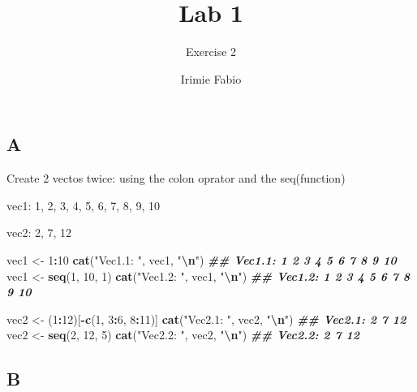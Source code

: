 \documentclass[
]{article}
\title{Lab 1}
\subtitle{Exercise 2}
\author{Irimie Fabio}
\date{}
\newenvironment{Shaded}{\begin{snugshade}}{\end{snugshade}}
\newcommand{\DecValTok}[1]{\textcolor[rgb]{0.00,0.00,0.81}{#1}}
\newcommand{\DocumentationTok}[1]{\textcolor[rgb]{0.56,0.35,0.01}{\textbf{\textit{#1}}}}
\newcommand{\FunctionTok}[1]{\textcolor[rgb]{0.13,0.29,0.53}{\textbf{#1}}}
\newcommand{\NormalTok}[1]{#1}
\newcommand{\OtherTok}[1]{\textcolor[rgb]{0.56,0.35,0.01}{#1}}
\newcommand{\SpecialCharTok}[1]{\textcolor[rgb]{0.81,0.36,0.00}{\textbf{#1}}}
\newcommand{\StringTok}[1]{\textcolor[rgb]{0.31,0.60,0.02}{#1}}
\begin{document}
\maketitle

{
\setcounter{tocdepth}{2}
\tableofcontents
}
\hypertarget{a}{%
\subsection{A}\label{a}}

Create 2 vectos twice: using the colon oprator and the seq(function)

vec1: 1, 2, 3, 4, 5, 6, 7, 8, 9, 10

vec2: 2, 7, 12

\begin{Shaded}
\begin{Highlighting}[]
\NormalTok{vec1 }\OtherTok{\textless{}{-}} \DecValTok{1}\SpecialCharTok{:}\DecValTok{10}
\FunctionTok{cat}\NormalTok{(}\StringTok{"Vec1.1: "}\NormalTok{, vec1, }\StringTok{"}\SpecialCharTok{\textbackslash{}n}\StringTok{"}\NormalTok{)}
\DocumentationTok{\#\# Vec1.1:  1 2 3 4 5 6 7 8 9 10}
\NormalTok{vec1 }\OtherTok{\textless{}{-}} \FunctionTok{seq}\NormalTok{(}\DecValTok{1}\NormalTok{, }\DecValTok{10}\NormalTok{, }\DecValTok{1}\NormalTok{)}
\FunctionTok{cat}\NormalTok{(}\StringTok{"Vec1.2: "}\NormalTok{, vec1, }\StringTok{"}\SpecialCharTok{\textbackslash{}n}\StringTok{"}\NormalTok{)}
\DocumentationTok{\#\# Vec1.2:  1 2 3 4 5 6 7 8 9 10}

\NormalTok{vec2 }\OtherTok{\textless{}{-}}\NormalTok{ (}\DecValTok{1}\SpecialCharTok{:}\DecValTok{12}\NormalTok{)[}\SpecialCharTok{{-}}\FunctionTok{c}\NormalTok{(}\DecValTok{1}\NormalTok{, }\DecValTok{3}\SpecialCharTok{:}\DecValTok{6}\NormalTok{, }\DecValTok{8}\SpecialCharTok{:}\DecValTok{11}\NormalTok{)]}
\FunctionTok{cat}\NormalTok{(}\StringTok{"Vec2.1: "}\NormalTok{, vec2, }\StringTok{"}\SpecialCharTok{\textbackslash{}n}\StringTok{"}\NormalTok{)}
\DocumentationTok{\#\# Vec2.1:  2 7 12}
\NormalTok{vec2 }\OtherTok{\textless{}{-}} \FunctionTok{seq}\NormalTok{(}\DecValTok{2}\NormalTok{, }\DecValTok{12}\NormalTok{, }\DecValTok{5}\NormalTok{)}
\FunctionTok{cat}\NormalTok{(}\StringTok{"Vec2.2: "}\NormalTok{, vec2, }\StringTok{"}\SpecialCharTok{\textbackslash{}n}\StringTok{"}\NormalTok{)}
\DocumentationTok{\#\# Vec2.2:  2 7 12}
\end{Highlighting}
\end{Shaded}

\hypertarget{b}{%
\subsection{B}\label{b}}
\end{document}
